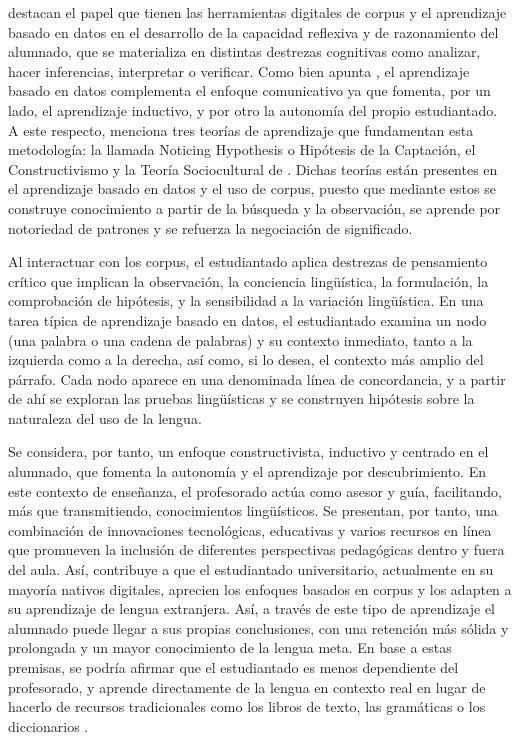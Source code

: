 \textcite{zapata-ros2018} destacan el papel que tienen las
herramientas digitales de corpus y el aprendizaje basado en datos en el
desarrollo de la capacidad reflexiva y de razonamiento del alumnado, que
se materializa en distintas destrezas cognitivas como analizar, hacer
inferencias, interpretar o verificar. Como bien apunta \textcite{boulton2009testing},
el aprendizaje basado en datos complementa el enfoque comunicativo ya
que fomenta, por un lado, el aprendizaje inductivo, y por otro la
autonomía del propio estudiantado. A este respecto, \textcite{flowerdew2015corpus}
menciona tres teorías de aprendizaje que fundamentan esta metodología:
la llamada Noticing Hypothesis o Hipótesis de la Captación, el
Constructivismo y la Teoría Sociocultural de \textcite{vygotsky1978mind}. Dichas teorías están presentes en el aprendizaje basado en datos y el uso de
corpus, puesto que mediante estos se construye conocimiento a partir de
la búsqueda y la observación, se aprende por notoriedad de patrones y se
refuerza la negociación de significado.

Al interactuar con los corpus, el estudiantado aplica destrezas de
pensamiento crítico que implican la observación, la conciencia
lingüística, la formulación, la comprobación de hipótesis, y la
sensibilidad a la variación lingüística. En una tarea típica de
aprendizaje basado en datos, el estudiantado examina un nodo (una
palabra o una cadena de palabras) y su contexto inmediato, tanto a la
izquierda como a la derecha, así como, si lo desea, el contexto más
amplio del párrafo. Cada nodo aparece en una denominada línea de
concordancia, y a partir de ahí se exploran las pruebas lingüísticas y
se construyen hipótesis sobre la naturaleza del uso de la lengua.

Se considera, por tanto, un enfoque constructivista, inductivo y
centrado en el alumnado, que fomenta la autonomía y el aprendizaje por
descubrimiento. En este contexto de enseñanza, el profesorado actúa como
asesor y guía, facilitando, más que transmitiendo, conocimientos
lingüísticos. Se presentan, por tanto, una combinación de innovaciones
tecnológicas, educativas y varios recursos en línea que promueven la
inclusión de diferentes perspectivas pedagógicas dentro y fuera del
aula. Así, contribuye a que el estudiantado universitario, actualmente
en su mayoría nativos digitales, aprecien los enfoques basados en corpus
y los adapten a su aprendizaje de lengua extranjera. Así, a través de
este tipo de aprendizaje el alumnado puede llegar a sus propias
conclusiones, con una retención más sólida y prolongada y un mayor
conocimiento de la lengua meta. En base a estas premisas, se podría
afirmar que el estudiantado es menos dependiente del profesorado, y
aprende directamente de la lengua en contexto real en lugar de hacerlo
de recursos tradicionales como los libros de texto, las gramáticas o los
diccionarios \cite{thomas2015deriving}.


